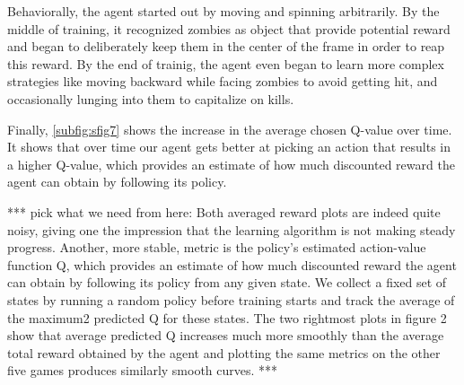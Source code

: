 \documentclass{article}
\begin{document}
\begin{multicols}{2}
Behaviorally, the agent started out by moving and spinning arbitrarily. By the middle of training, it recognized zombies as object that provide potential reward and began to deliberately keep them in the center of the frame in order to reap this reward. By the end of trainig, the agent even began to learn more complex strategies like moving backward while facing zombies to avoid getting hit, and occasionally lunging into them to capitalize on kills. 

Finally, \ref{subfig:sfig7} shows the increase in the average chosen Q-value over time. It shows that over time our agent gets better at picking an action that results in a higher Q-value, which provides an estimate of how much discounted reward the agent can obtain by following its policy.

*** pick what we need from here:
Both averaged reward plots are indeed quite noisy, giving one the impression that the learning algorithm is not making steady progress. Another, more stable, metric is the policy’s estimated action-value function Q, which provides an estimate of how much discounted reward the agent can obtain by following its policy from any given state. We collect a fixed set of states by running a random policy before training starts and track the average of the maximum2 predicted Q for these states. The two rightmost plots in figure 2 show that average predicted Q increases much more smoothly than the average total reward obtained by the agent and plotting the same metrics on the other five games produces similarly smooth curves.
***


\end{multicols}
\end{document}

